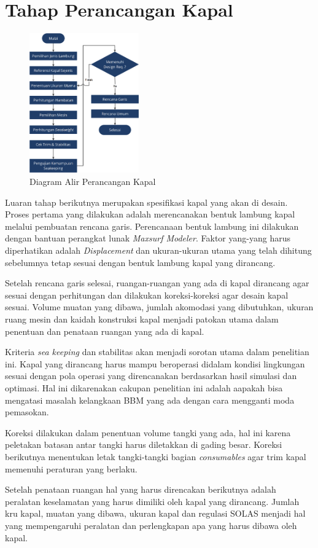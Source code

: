 \section{Tahap Perancangan Kapal}
\label{sec:tahap-deskap}

\begin{figure}[!ht]
    \centering
    \includegraphics[width=0.42\textwidth]{gambar/FC_Deskap.png}
    \caption{Diagram Alir Perancangan Kapal}
    \label{fig:flowchart-deskap}
\end{figure}

Luaran tahap berikutnya merupakan spesifikasi kapal yang akan di desain. Proses pertama yang dilakukan adalah merencanakan bentuk lambung kapal melalui pembuatan rencana garis. Perencanaan bentuk lambung ini dilakukan dengan bantuan perangkat lunak \emph{Maxsurf Modeler}. Faktor yang-yang harus diperhatikan adalah \emph{Displacement} dan ukuran-ukuran utama yang telah dihitung sebelumnya tetap sesuai dengan bentuk lambung kapal yang dirancang.

Setelah rencana garis selesai, ruangan-ruangan yang ada di kapal dirancang agar sesuai dengan perhitungan dan dilakukan koreksi-koreksi agar desain kapal sesuai. Volume muatan yang dibawa, jumlah akomodasi yang dibutuhkan, ukuran ruang mesin dan kaidah konstruksi kapal menjadi patokan utama dalam penentuan dan penataan ruangan yang ada di kapal.

Kriteria \emph{sea keeping} dan stabilitas akan menjadi sorotan utama dalam penelitian ini. Kapal yang dirancang harus mampu beroperasi didalam kondisi lingkungan sesuai dengan pola operasi yang direncanakan berdasarkan hasil simulasi dan optimasi. Hal ini dikarenakan cakupan penelitian ini adalah aapakah bisa mengatasi masalah kelangkaan BBM yang ada dengan cara mengganti moda pemasokan.

Koreksi dilakukan dalam penentuan volume tangki yang ada, hal ini karena peletakan batasan antar tangki harus diletakkan di gading besar. Koreksi berikutnya menentukan letak tangki-tangki bagian \emph{consumables} agar trim kapal memenuhi peraturan yang berlaku.

Setelah penataan ruangan hal yang harus direncakan berikutnya adalah peralatan keselamatan yang harus dimiliki oleh kapal yang dirancang. Jumlah kru kapal, muatan yang dibawa, ukuran kapal dan regulasi SOLAS menjadi hal yang mempengaruhi peralatan dan perlengkapan apa yang harus dibawa oleh kapal.
